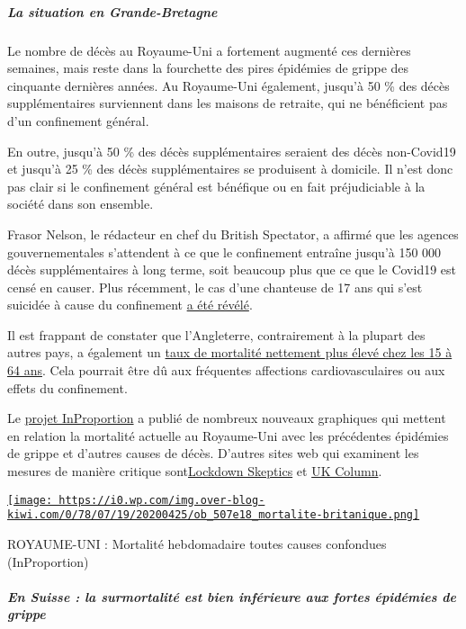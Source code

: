 \hypertarget{la-situation-en-grande-bretagne}{%
\subparagraph{\texorpdfstring{\textbf{La situation en
Grande-Bretagne}}{La situation en Grande-Bretagne}}\label{la-situation-en-grande-bretagne}}

Le nombre de décès au Royaume-Uni a fortement augmenté ces dernières
semaines, mais reste dans la fourchette des pires épidémies de grippe
des cinquante dernières années. Au Royaume-Uni également, jusqu'à 50 \%
des décès supplémentaires surviennent dans les maisons de retraite, qui
ne bénéficient pas d'un confinement général.

En outre, jusqu'à 50 \% des décès supplémentaires seraient des décès
non-Covid19 et jusqu'à 25 \% des décès supplémentaires se produisent à
domicile. Il n'est donc pas clair si le confinement général est
bénéfique ou en fait préjudiciable à la société dans son ensemble.

Frasor Nelson, le rédacteur en chef du British Spectator, a affirmé que
les agences gouvernementales s'attendent à ce que le confinement
entraîne jusqu'à 150 000 décès supplémentaires à long terme, soit
beaucoup plus que ce que le Covid19 est censé en causer. Plus récemment,
le cas d'une chanteuse de 17 ans qui s'est suicidée à cause du
confinement
\href{https://sports.yahoo.com/coronavirus-bethany-palmer-teenager-death-suicide-152707750.html}{a
été révélé}.

Il est frappant de constater que l'Angleterre, contrairement à la
plupart des autres pays, a également un
\href{https://www.euromomo.eu/}{taux de mortalité nettement plus élevé
chez les 15 à 64 ans}. Cela pourrait être dû aux fréquentes affections
cardiovasculaires ou aux effets du confinement.

Le \href{http://inproportion2.talkigy.com/}{projet InProportion} a
publié de nombreux nouveaux graphiques qui mettent en relation la
mortalité actuelle au Royaume-Uni avec les précédentes épidémies de
grippe et d'autres causes de décès. D'autres sites web qui examinent les
mesures de manière critique
sont\href{https://lockdownsceptics.org/}{Lockdown Skeptics} et
\href{https://www.ukcolumn.org/}{UK Column}.

\href{http://img.over-blog-kiwi.com/0/78/07/19/20200425/ob_507e18_mortalite-britanique.png\#width=736\&height=363}{\texttt{[image: https://i0.wp.com/img.over-blog-kiwi.com/0/78/07/19/20200425/ob\_507e18\_mortalite-britanique.png]}}

ROYAUME-UNI : Mortalité hebdomadaire toutes causes confondues
(InProportion)

\hypertarget{en-suisse--la-surmortalituxe9-est-bien-infuxe9rieure-aux-fortes-uxe9piduxe9mies-de-grippe}{%
\subparagraph{\texorpdfstring{\textbf{En Suisse : la surmortalité est
bien inférieure aux fortes épidémies de
grippe}}{En Suisse : la surmortalité est bien inférieure aux fortes épidémies de grippe}}\label{en-suisse--la-surmortalituxe9-est-bien-infuxe9rieure-aux-fortes-uxe9piduxe9mies-de-grippe}}

